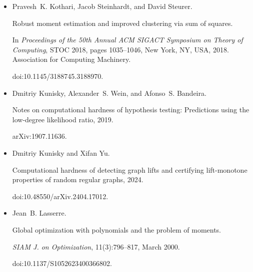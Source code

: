 \documentclass[10pt,a4paper]{article}
\begin{document}
\begin{itemize}
Pravesh K. Kothari, Aaron Potechin, and Jeff Xu.


Sum-of-squares lower bounds for independent set on ultra-sparse
random graphs.


In \emph{Proceedings of the 56th Annual ACM Symposium on Theory of
Computing}, STOC 2024, pages 1923–1934, New York, NY, USA, 2024. Association
for Computing Machinery.


doi:10.1145/3618260.3649703.





\item[] 
[30]

Pravesh K. Kothari, Jacob Steinhardt, and David Steurer.


Robust moment estimation and improved clustering via sum of squares.


In \emph{Proceedings of the 50th Annual ACM SIGACT Symposium on Theory
of Computing}, STOC 2018, pages 1035–1046, New York, NY, USA, 2018.
Association for Computing Machinery.


doi:10.1145/3188745.3188970.





\item[] 
[31]

Dmitriy Kunisky, Alexander S. Wein, and Afonso S. Bandeira.


Notes on computational hardness of hypothesis testing: Predictions
using the low-degree likelihood ratio, 2019.


arXiv:1907.11636.





\item[] 
[32]

Dmitriy Kunisky and Xifan Yu.


Computational hardness of detecting graph lifts and certifying
lift-monotone properties of random regular graphs, 2024.


doi:10.48550/arXiv.2404.17012.





\item[] 
[33]

Jean B. Lasserre.


Global optimization with polynomials and the problem of moments.


\emph{SIAM J. on Optimization}, 11(3):796–817, March 2000.


doi:10.1137/S1052623400366802.






\end{itemize}
\end{document}
